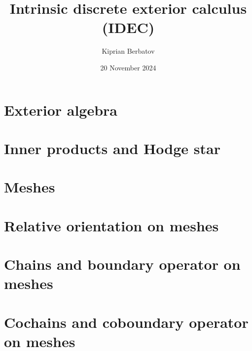 \documentclass[fleqn]{article}
\title{Intrinsic discrete exterior calculus (IDEC)}
\author{Kiprian Berbatov}
\date{20 November 2024}
\theoremstyle{definition}
\begin{document}
\maketitle

\tableofcontents

\section{Exterior algebra}
\label{section:exterior_algebra}


\section{Inner products and Hodge star}
\label{section:inner_products_and_hodge_star}


\section{Meshes}
\label{section:meshes}


\section{Relative orientation on meshes}
\label{section:relative_orientation_on_meshes}





\section{Chains and boundary operator on meshes}
\label{section:chains_and_boundary_operator_on_meshes}








\section{Cochains and coboundary operator on meshes}
\label{section:cochains_and_coboundary_operator_on_meshes}




\end{document}
